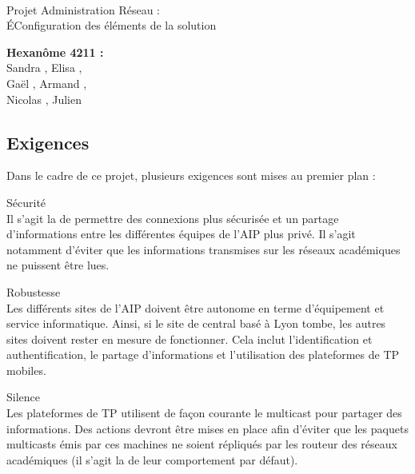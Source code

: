 \documentclass[a4paper]{article}
\begin{document}
\begin{titlepage}
	~ 
	\vfill
	\begin{center}
		\begin{Huge}
			Projet Administration Réseau : \\ ÉConfiguration des éléments de la solution\\
		\end{Huge}
	\vfill
		\textbf{Hexanôme 4211 :} 
			\\Sandra {}, Elisa , 
			\\Gaël , Armand , 
			\\Nicolas {}, Julien \\
	\vfill
	\end{center}
	\vfill
\end{titlepage}

\newpage
\tableofcontents
\newpage


\subsection{Exigences}
Dans le cadre de ce projet, plusieurs exigences sont mises au premier plan :
\begin{description}
\item{Sécurité}\\
	Il s'agit la de permettre des connexions plus sécurisée et un partage d'informations entre les différentes équipes de l'AIP plus privé. Il s'agit notamment d'éviter que les informations transmises sur les réseaux académiques ne puissent être lues.
   
\item{Robustesse}\\
	Les différents sites de l'AIP doivent être autonome en terme d'équipement et service informatique. Ainsi, si le site de central basé à Lyon tombe, les autres sites doivent rester en mesure de fonctionner. Cela inclut l'identification et authentification, le partage d'informations et l'utilisation des plateformes de TP mobiles.
   
\item{Silence}\\
	Les plateformes de TP utilisent de façon courante le multicast pour partager des informations. Des actions devront être mises en place afin d'éviter que les paquets multicasts émis par ces machines ne soient répliqués par les routeur des réseaux académiques (il s'agit la de leur comportement par défaut).

\end{description}
	
\end{document}
